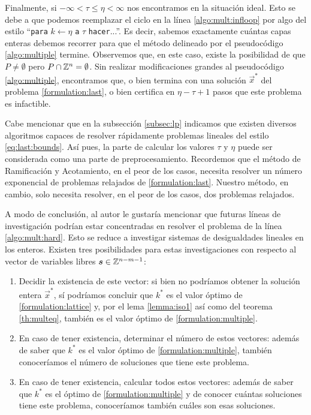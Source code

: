 Finalmente, si $-\infty < \tau \leq \eta < \infty$ nos encontramos en la situación ideal. Esto
se debe a que podemos reemplazar el ciclo en la línea \ref{algo:mult:infloop} por algo del estilo
``\texttt{para} $k \leftarrow \eta$ \texttt{a} $\tau$ \texttt{hacer}...''. Es decir, sabemos exactamente
cuántas capas enteras debemos recorrer para que el método delineado por el pseudocódigo
\eqref{algo:multiple} termine. Observemos que, en este caso, existe la posibilidad de que $P \neq
\emptyset$ pero $P \cap \mathbb{Z}^n = \emptyset$. Sin realizar modificaciones grandes al pseudocódigo
\eqref{algo:multiple}, encontramos que, o bien termina con una solución $\vec{x}^*$ del problema
\eqref{formulation:last}, o bien certifica en $\eta - \tau + 1$ pasos que este problema es infactible.

Cabe mencionar que en la subsección \eqref{subsec:lp} indicamos que existen diversos algoritmos
capaces de resolver rápidamente problemas lineales del estilo \eqref{eq:last:bounds}. Así pues, la
parte de calcular los valores $\tau$ y $\eta$ puede ser considerada como una parte de
preprocesamiento. Recordemos que el método de Ramificación y Acotamiento, en el peor de los casos,
necesita resolver un número exponencial de problemas relajados de \eqref{formulation:last}. Nuestro
método, en cambio, solo necesita resolver, en el peor de los casos, dos problemas relajados.

A modo de conclusión, al autor le gustaría mencionar que futuras líneas de investigación podrían
estar concentradas en resolver el problema de la línea \ref{algo:mult:hard}. Esto se reduce a
investigar sistemas de desigualdades lineales en los enteros. Existen tres posibilidades para estas
investigaciones con respecto al vector de variables libres $\boldsymbol{s} \in \mathbb{Z}^{n-m-1}$:
\begin{enumerate}
	\item Decidir la existencia de este vector: si bien no podríamos obtener la solución entera
		$\vec{x}^*$, sí podríamos concluir que $k^*$ es el valor óptimo de
		\eqref{formulation:lattice} y, por el lema \ref{lemma:iso1} así como del teorema
		\ref{th:multeq}, también es el valor óptimo de \eqref{formulation:multiple}.
	\item En caso de tener existencia, determinar el número de estos vectores: además de saber que
		$k^*$ es el valor óptimo de \eqref{formulation:multiple}, también conoceríamos el número de
		soluciones que tiene este problema.
	\item En caso de tener existencia, calcular todos estos vectores: además de saber que $k^*$ es
		el óptimo de \eqref{formulation:multiple} y de conocer cuántas soluciones tiene este
		problema, conoceríamos también cuáles son esas soluciones.
\end{enumerate}

